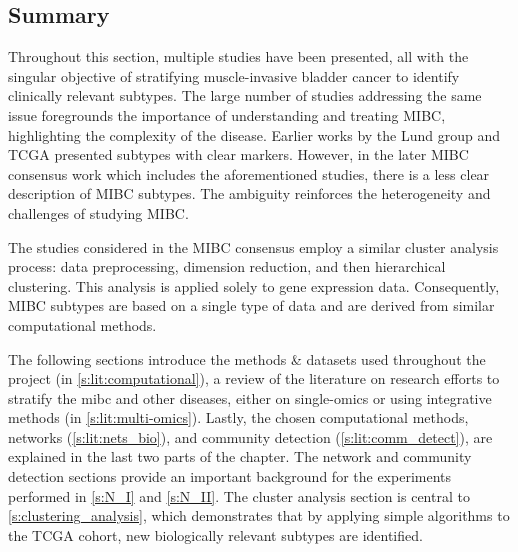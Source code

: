 
\subsection{Summary}

Throughout this section, multiple studies have been presented, all with the singular objective of stratifying muscle-invasive bladder cancer to identify clinically relevant subtypes. The large number of studies addressing the same issue foregrounds the importance of understanding and treating MIBC, highlighting the complexity of the disease. Earlier works by the Lund group \citep{Sjodahl2017-xr,Marzouka2018-ge} and TCGA \citep{Tcga2014-dr,Robertson2017-mg} presented subtypes with clear markers. However, in the later MIBC consensus work \citep{Kamoun2020-tj} which includes the aforementioned studies, there is a less clear description of MIBC subtypes. The ambiguity reinforces the heterogeneity and challenges of studying MIBC.

The studies considered in the MIBC consensus employ a similar cluster analysis process: data preprocessing, dimension reduction, and then hierarchical clustering. This analysis is applied solely to gene expression data. Consequently, MIBC subtypes are based on a single type of data and are derived from similar computational methods.

The following sections introduce the methods \& datasets used throughout the project (in \cref{s:lit:computational}), a review of the literature on research efforts to stratify the \acrshort{mibc} and other diseases, either on single-omics or using integrative methods (in \cref{s:lit:multi-omics}). Lastly, the chosen computational methods, networks (\cref{s:lit:nets_bio}), and community detection (\cref{s:lit:comm_detect}), are explained in the last two parts of the chapter. The network and community detection sections provide an important background for the experiments performed in \cref{s:N_I} and \cref{s:N_II}. The cluster analysis section is central to \cref{s:clustering_analysis}, which demonstrates that by applying simple algorithms to the TCGA cohort, new biologically relevant subtypes are identified.




